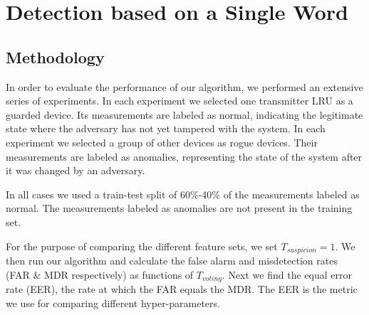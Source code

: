 \documentclass[compsoc,conference,a4paper,10pt,times]{IEEEtran}
\newcommand{\level}[1]{\section{#1}}
\newcommand{\sublevel}[1]{\subsection{#1}}
\newcommand{\level}[1]{\chapter{#1}}
\newcommand{\sublevel}[1]{\section{#1}}
\begin{document}
  \begin{table}
    \caption{Number of Features per Segment Type}
    \label{tab:feature_set_sizes}
    \centering
  \end{table}
  

\level{Detection based on a Single Word} \label{PerformanceEvaluationSingleWord}
\sublevel{Methodology} \label{Methodology}
  In order to evaluate the performance of our algorithm, we performed an extensive series of experiments. In each experiment we selected one transmitter LRU as a guarded device. Its measurements are labeled as normal, indicating the legitimate state where the adversary has not yet tampered with the system. In each experiment we selected a group of other devices as rogue devices. Their measurements are labeled as anomalies, representing the state of the system after it was changed by an adversary.
  
  In all cases we used a train-test split of 60\%-40\% of the measurements labeled as normal. The measurements labeled as anomalies are not present in the training set.
  
  For the purpose of comparing the different feature sets, we set $T_{suspicion} = 1$. We then run our algorithm and calculate the false alarm and misdetection rates (FAR \& MDR respectively) as functions of $T_{voting}$. Next we find the equal error rate (EER), the rate at which the FAR equals the MDR. The EER is the metric we use for comparing different hyper-parameters.
  
\end{document}
